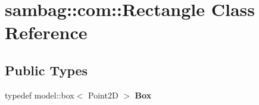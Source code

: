 \hypertarget{classsambag_1_1com_1_1_rectangle}{
\section{sambag::com::Rectangle Class Reference}
\label{classsambag_1_1com_1_1_rectangle}
}
\subsection*{Public Types}
\begin{DoxyCompactItemize}
\item 
\hypertarget{classsambag_1_1com_1_1_rectangle_ac74ea0e89abbe4d9597c652f5acaed94}{
typedef model::box$<$ Point2D $>$ {\bfseries Box}}
\label{classsambag_1_1com_1_1_rectangle_ac74ea0e89abbe4d9597c652f5acaed94}

\end{DoxyCompactItemize}
